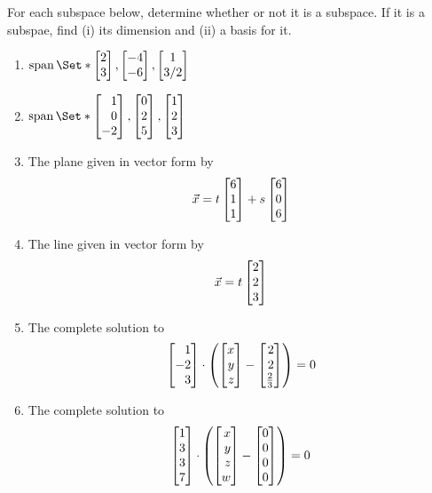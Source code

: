 \begin{exercises}
\begin{problist}
		\prob For each subspace below, determine whether or not it is a subspace.
		If it is a subspae, find (i) its dimension and (ii) a basis for it.
		\begin{enumerate}
			\item $\Span\Set*{\mat{2\\3}, \mat{-4\\-6}, \matc{1\\3/2}}$
			\item $\Span\Set*{\mat{1\\0\\-2}, \mat{0\\2\\5}, \mat{1\\2\\3}}$
			\item The plane given in vector form by
			\[
				\vec x = t\mat{6\\1\\1}+s\mat{6\\0\\6}
			\]
			\item The line given in vector form by
			\[
				\vec x = t\mat{2\\2\\3}
			\]
			\item The complete solution to
			\[
				\mat{1\\-2\\3} \cdot \left(\mat{x\\y\\z}-\mat{2\\2\\\frac{2}{3}}\right)=0
			\]
			\item The complete solution to
			\[
				\mat{1\\3\\3\\7} \cdot \left(\mat{x\\y\\z\\w}-\mat{0\\0\\0\\0}\right)=0
			\]
		\end{enumerate}


\end{problist}
\end{exercises}
